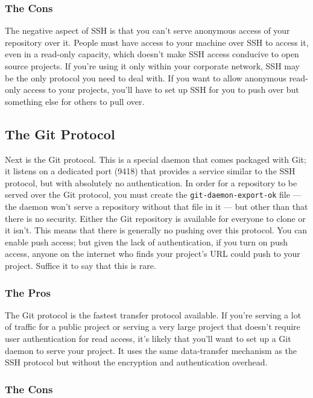 \documentclass[a4paper]{book}
\begin{document}
\subsubsection{The Cons}

The negative aspect of SSH is that you can't serve anonymous access of your repository over it. People must have access to your machine over SSH to access it, even in a read-only capacity, which doesn't make SSH access conducive to open source projects. If you're using it only within your corporate network, SSH may be the only protocol you need to deal with. If you want to allow anonymous read-only access to your projects, you'll have to set up SSH for you to push over but something else for others to pull over.

\subsection{The Git Protocol}\label{the-git-protocol}

Next is the Git protocol. This is a special daemon that comes packaged with Git; it listens on a dedicated port (9418) that provides a service similar to the SSH protocol, but with absolutely no authentication. In order for a repository to be served over the Git protocol, you must create the \texttt{git-daemon-export-ok} file --- the daemon won't serve a repository without that file in it --- but other than that there is no security. Either the Git repository is available for everyone to clone or it isn't. This means that there is generally no pushing over this protocol. You can enable push access; but given the lack of authentication, if you turn on push access, anyone on the internet who finds your project's URL could push to your project. Suffice it to say that this is rare.

\subsubsection{The Pros}

The Git protocol is the fastest transfer protocol available. If you're serving a lot of traffic for a public project or serving a very large project that doesn't require user authentication for read access, it's likely that you'll want to set up a Git daemon to serve your project. It uses the same data-transfer mechanism as the SSH protocol but without the encryption and authentication overhead.

\subsubsection{The Cons}
\end{document}
